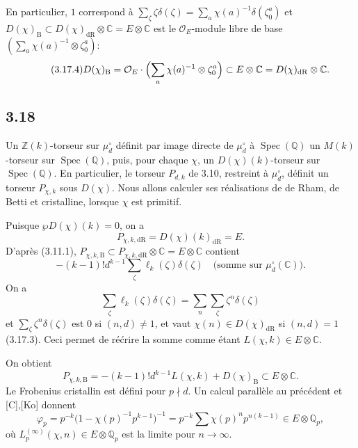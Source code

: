 \documentclass[12pt,a4paper]{article}
\theoremstyle{plain}
\theoremstyle{definition}
\theoremstyle{remark}
\DeclareMathOperator{\Spec}{Spec}
\newcommand{\DR}{\mathrm{dR}}
\newcommand{\B}{\mathrm{B}}
\newcommand{\OO}{\mathcal{O}}
\newcommand{\Z}{\mathbb{Z}}
\newcommand{\Q}{\mathbb{Q}}
\newcommand{\C}{\mathbb{C}}
\begin{document}
En particulier, $1$ correspond \`a $\sum_\zeta \zeta\delta(\zeta) = \sum_a \chi(a)^{-1}\delta(\zeta_0^a)$ et $D(\chi)_{\B} \subset D(\chi)_{\DR} \otimes \C = E \otimes \C$ est le $\OO_E$-module libre de base $(\sum_a \chi(a)^{-1} \otimes \zeta_0^a)$:
\begin{equation*}\tag{3.17.4}
D(\chi)_{\B} = \OO_E \cdot \Bigl(\sum_a \chi(a)^{-1} \otimes \zeta_0^a\Bigr) \subset E \otimes \C = D(\chi)_{\DR} \otimes \C.
\end{equation*}

\subsection*{3.18}

Un $\Z(k)$-torseur sur $\mu_d^\circ$ d\'efinit par image directe de $\mu_d^\circ$ \`a $\Spec(\Q)$ un $M(k)$-torseur sur $\Spec(\Q)$, puis, pour chaque $\chi$, un $D(\chi)(k)$-torseur sur $\Spec(\Q)$. En particulier, le torseur $P_{d,k}$ de 3.10, restreint \`a $\mu_d^\circ$, d\'efinit un torseur $P_{\chi,k}$ sous $D(\chi)$. Nous allons calculer ses r\'ealisations de de Rham, de Betti et cristalline, lorsque $\chi$ est primitif.

Puisque $\wp D(\chi)(k) = 0$, on a
\begin{equation*}\tag{3.18.1}
P_{\chi,k,\DR} = D(\chi)(k)_{\DR} = E.
\end{equation*}
D'apr\`es (3.11.1), $P_{\chi,k,\B} \subset P_{\chi,k,\DR} \otimes \C = E \otimes \C$ contient
\[
-(k-1)!d^{k-1} \sum_\zeta \ell_k(\zeta)\delta(\zeta) \quad \text{(somme sur } \mu_d^\circ(\C)\text{)}.
\]
On a
\[
\sum_\zeta \ell_k(\zeta)\delta(\zeta) = \sum_n \sum_\zeta \zeta^n \delta(\zeta)
\]
et $\sum_\zeta \zeta^n\delta(\zeta)$ est $0$ si $(n,d) \neq 1$, et vaut $\chi(n) \in D(\chi)_{\DR}$ si $(n,d)=1$ (3.17.3). Ceci permet de r\'e\'crire la somme comme \'etant $L(\chi,k) \in E \otimes \C$.

On obtient
\begin{equation*}\tag{3.18.2}
P_{\chi,k,\B} = -(k-1)!d^{k-1}L(\chi,k) + D(\chi)_{\B} \subset E \otimes \C.
\end{equation*}
Le Frobenius cristallin est d\'efini pour $p \nmid d$. Un calcul parall\`ele au pr\'ec\'edent et [C],[Ko] donnent
\begin{equation*}\tag{3.18.3}
\varphi_p = p^{-k}\bigl(1 - \chi(p)^{-1}p^{k-1}\bigr)^{-1} = p^{-k}\sum \chi(p)^n p^{n(k-1)} \in E \otimes \Q_p,
\end{equation*}
o\`u $L_p^{(\infty)}(\chi,n) \in E \otimes \Q_p$ est la limite pour $n \to \infty$.
\end{document}
